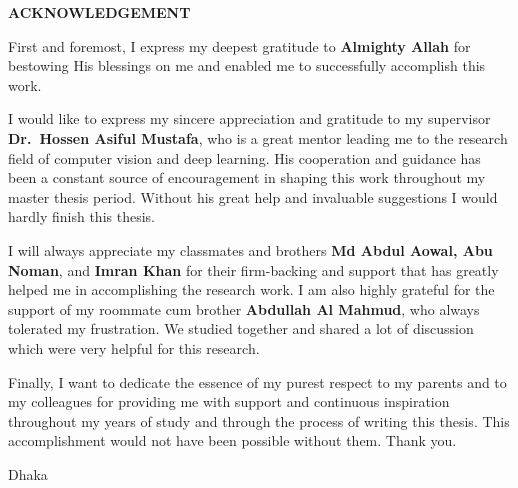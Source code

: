 \begin{center}
  \textbf{{\Large ACKNOWLEDGEMENT}}\\[60pt]
\end{center}

First and foremost, I express my deepest gratitude to \textbf{Almighty Allah} for bestowing His blessings on me and enabled me to successfully accomplish this work. 

I would like to express my sincere appreciation and gratitude to my supervisor \textbf{Dr.\ Hossen Asiful Mustafa}, who is a great mentor leading me to the research field of computer vision and deep learning. His cooperation and guidance has been a constant source of encouragement in shaping this work throughout my master thesis period. Without his great help and invaluable suggestions I would hardly finish this thesis. 

I will always appreciate my classmates and brothers \textbf{Md Abdul Aowal, Abu Noman}, and \textbf{Imran Khan} for their firm-backing and support that has greatly helped me in accomplishing the research work. I am also highly grateful for the support of my roommate cum brother \textbf{Abdullah Al Mahmud}, who always tolerated my frustration. We studied together and shared a lot of discussion which were very helpful for this research.

Finally, I want to dedicate the essence of my purest respect to my parents and to my colleagues for providing me with  support and continuous inspiration throughout my years of study and through the process of writing this thesis. This accomplishment would not have been possible without them. Thank you.

\vspace*{20.0mm}

\begin{minipage}[t]{0.2\textwidth}
  Dhaka\par
  \thesisdate
\end{minipage}%
\hfill
\begin{minipage}[t]{0.45\textwidth}
  \begin{enumerate}
    \vspace{-0.75\baselineskip}
  \end{enumerate}
\end{minipage}

\endinput
